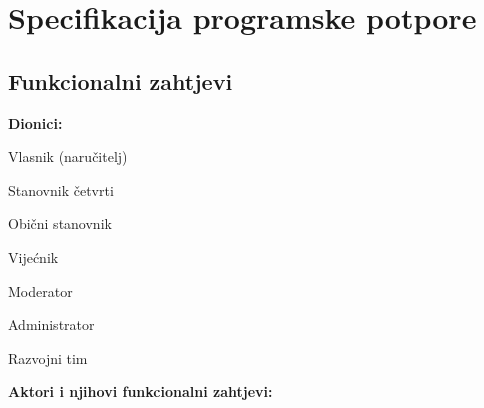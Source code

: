 \chapter{Specifikacija programske potpore}
		
	\section{Funkcionalni zahtjevi}
			
			\noindent \textbf{Dionici:}
			
			\begin{packed_enum}
				
				\item Vlasnik (naručitelj)
				\item Stanovnik četvrti			
				\begin{packed_enum}
					\item  Obični stanovnik
					\item  Vijećnik
					\item  Moderator
				\end{packed_enum}
				\item Administrator	
				\item Razvojni tim
				
			\end{packed_enum}
			
			\noindent \textbf{Aktori i njihovi funkcionalni zahtjevi:}
			
